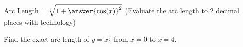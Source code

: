 \documentclass{ximera}
\begin{document}
\begin{problem}

Arc Length = $\sqrt{1+{\answer{\cos(x)}^2}}$ (Evaluate the arc length to 2 decimal places with technology)

\end{problem}

\begin{problem}

Find the exact arc length of $y = x^{\frac{3}{2}}$ from $x=0$ to $x=4$.


\end{problem}
\end{document}
